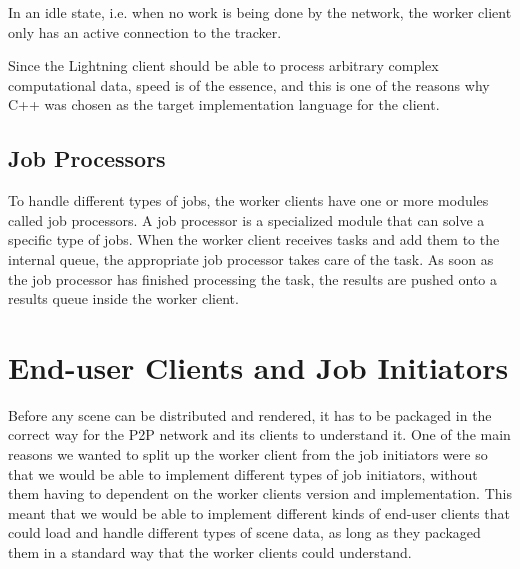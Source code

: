 In an idle state, i.e. when no work is being done by the network, the worker client only has an active connection to the tracker.





Since the Lightning client should be able to process arbitrary complex computational data, speed is of the essence, and this is one of the reasons why C++ was chosen as the target implementation language for the client.

\subsection{Job Processors}
  To handle different types of jobs, the worker clients have one or more modules called job processors. A job processor is a specialized module that can solve a specific type of jobs. When the worker client receives tasks and add them to the internal queue, the appropriate job processor takes care of the task. As soon as the job processor has finished processing the task, the results are pushed onto a results queue inside the worker client.

\section{End-user Clients and Job Initiators}
Before any scene can be distributed and rendered, it has to be packaged in the correct way for the P2P network and its clients to understand it. One of the main reasons we wanted to split up the worker client from the job initiators were so that we would be able to implement different types of job initiators, without them having to dependent on the worker clients version and implementation. This meant that we would be able to implement different kinds of end-user clients that could load and handle different types of scene data, as long as they packaged them in a standard way that the worker clients could understand.


